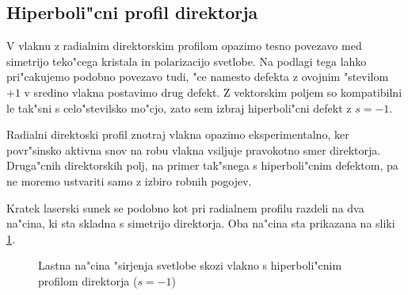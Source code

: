 \documentclass[a4paper,10pt]{article}
\begin{document}
\subsection{Hiperboli"cni profil direktorja}

V vlaknu z radialnim direktorskim profilom opazimo tesno povezavo med simetrijo teko"cega kristala in polarizacijo svetlobe. 
Na podlagi tega lahko pri"cakujemo podobno povezavo tudi, "ce namesto defekta z ovojnim "stevilom $+1$ v sredino vlakna postavimo drug defekt. 
Z vektorskim poljem so kompatibilni le tak"sni s celo"stevilsko mo"cjo, zato sem izbraj hiperboli"cni defekt z $s=-1$. 

Radialni direktoski profil znotraj vlakna opazimo eksperimentalno, ker povr"sinsko aktivna snov na robu vlakna vsiljuje pravokotno smer direktorja. 
Druga"cnih direktorskih polj, na primer tak"snega s hiperboli"cnim defektom, pa ne moremo ustvariti samo z izbiro robnih pogojev. 

Kratek laserski sunek se podobno kot pri radialnem profilu razdeli na dva na"cina, ki sta skladna s simetrijo direktorja. 
Oba na"cina sta prikazana na sliki \ref{fig:pulse-m1-mode}. 

\begin{figure}[h]
 \centering
 \caption{Lastna na"cina "sirjenja svetlobe skozi vlakno s hiperboli"cnim profilom direktorja ($s=-1$)}
 \label{fig:pulse-m1-mode}
\end{figure}
\end{document}
